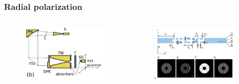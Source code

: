 \documentclass{beamer}
\begin{document}
\begin{frame}
	\frametitle{Radial polarization}
	\begin{columns}
		\begin{column}{0.5\textwidth}
			\begin{figure}
				\includegraphics[width=\textwidth]{../images/dmg/express_exp_setu.png}\\
			\end{figure}
		\end{column}
		\begin{column}{0.5\textwidth}
			\begin{figure}
				\includegraphics[width=\textwidth]{../images/dmg/express_siatki.png}\\
			\end{figure}
		\end{column}
	\end{columns}
	{\tiny \cite{Yavorskiy:14}}
		
\end{frame}
\end{document}
